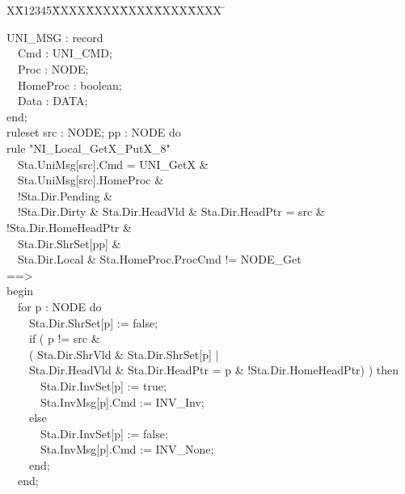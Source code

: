 \documentclass{llncs-new}
\newlength{\fminilength}
\newenvironment{fmini}[1][\linewidth]
  {\setlength{\fminilength}{#1\fboxsep-2\fboxrule}%
   \vspace{2ex}\noindent\begin{lrbox}{\fminibox}\begin{minipage}{\fminilength}%
   \mbox{ }\hfill\vspace{-2.5ex}}%
  {\end{minipage}\end{lrbox}\vspace{1ex}\hspace{0ex}%
   \framebox{\usebox{\fminibox}}}
\newenvironment{specification}
{\noindent\scriptsize
\tt\begin{fmini}\begin{tabbing}X\=X12345\=XXXX\=XXXX\=XXXX\=XXXX\=XXXX
\=\+\kill} {\end{tabbing}\normalfont\end{fmini}}
\def \twoSpaces {\ \ }
\def \twoSpaces {\ \ }
\begin{document}
\begin{specification}


\begin{minipage}[t]{0.5\linewidth}
  UNI\_MSG : record \\
\indent \twoSpaces     Cmd : UNI\_CMD;\\
\indent \twoSpaces     Proc : NODE;\\
\indent \twoSpaces     HomeProc : boolean;\\
\indent \twoSpaces     Data : DATA;\\
  end;\\
ruleset src : NODE; pp : NODE do\\
rule "NI\_Local\_GetX\_PutX\_8"\\
\indent \twoSpaces  Sta.UniMsg[src].Cmd = UNI\_GetX \&\\
\indent \twoSpaces  Sta.UniMsg[src].HomeProc \&\\
\indent \twoSpaces  !Sta.Dir.Pending \&\\
\indent \twoSpaces  !Sta.Dir.Dirty \& Sta.Dir.HeadVld \& Sta.Dir.HeadPtr = src \& !Sta.Dir.HomeHeadPtr \&\\
\indent \twoSpaces  Sta.Dir.ShrSet[pp] \&\\
\indent \twoSpaces  Sta.Dir.Local \& Sta.HomeProc.ProcCmd != NODE\_Get\\
==>\\
begin\\

\indent \twoSpaces  for p : NODE do\\
\indent \twoSpaces\twoSpaces    Sta.Dir.ShrSet[p] := false;\\
\indent \twoSpaces\twoSpaces    if ( p != src \&\\
\indent \twoSpaces\twoSpaces           ( Sta.Dir.ShrVld \& Sta.Dir.ShrSet[p] |\\
\indent \twoSpaces\twoSpaces             Sta.Dir.HeadVld \& Sta.Dir.HeadPtr = p \& !Sta.Dir.HomeHeadPtr) ) then\\
\indent \twoSpaces\twoSpaces\twoSpaces        Sta.Dir.InvSet[p] := true;\\
\indent \twoSpaces\twoSpaces\twoSpaces      Sta.InvMsg[p].Cmd := INV\_Inv;\\
\indent \twoSpaces\twoSpaces     else\\
\indent \twoSpaces\twoSpaces\twoSpaces       Sta.Dir.InvSet[p] := false;\\
 \indent \twoSpaces\twoSpaces\twoSpaces      Sta.InvMsg[p].Cmd := INV\_None;\\
\indent \twoSpaces\twoSpaces     end;\\
\indent \twoSpaces  end;\\



\end{minipage}
\end{specification}
\end{document}
